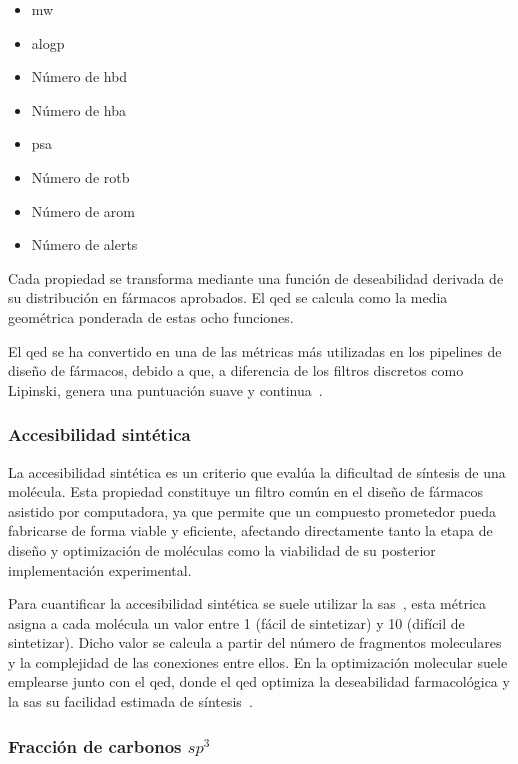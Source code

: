 \begin{itemize}
    \item \Gls{mw}
    \item \Gls{alogp}
    \item Número de \gls{hbd}
    \item Número de \gls{hba}
    \item \Gls{psa}
    \item Número de \gls{rotb}
    \item Número de \gls{arom}
    \item Número de \gls{alerts}
\end{itemize}

Cada propiedad se transforma mediante una función de deseabilidad derivada de su distribución en fármacos aprobados. El \gls{qed} se calcula como la media geométrica ponderada de estas ocho funciones.

El \Gls{qed} se ha convertido en una de las métricas más utilizadas en los pipelines de diseño de fármacos, debido a que, a diferencia de los filtros discretos como Lipinski, genera una puntuación suave y continua~\cite{Xia2024MolecularOptimization}.

\subsubsection{Accesibilidad sintética}
\label{subsec:sa}

La accesibilidad sintética es un criterio que evalúa la dificultad de síntesis de una molécula. Esta propiedad constituye un filtro común en el diseño de fármacos asistido por computadora, ya que permite que un compuesto prometedor pueda fabricarse de forma viable y eficiente, afectando directamente tanto la etapa de diseño y optimización de moléculas como la viabilidad de su posterior implementación experimental.

Para cuantificar la accesibilidad sintética se suele utilizar la \gls{sas}~\cite{Ertl2009SAScore}, esta métrica asigna a cada molécula un valor entre 1 (fácil de sintetizar) y 10 (difícil de sintetizar). Dicho valor se calcula a partir del número de fragmentos moleculares y la complejidad de las conexiones entre ellos. En la optimización molecular suele emplearse junto con el \gls{qed}, donde el \gls{qed} optimiza la deseabilidad farmacológica y la \gls{sas} su facilidad estimada de síntesis~\cite{Xia2024MolecularOptimization}.


\subsubsection{Fracción de carbonos \texorpdfstring{$sp^3$}{sp3}}
\label{subsec:fsp3}

